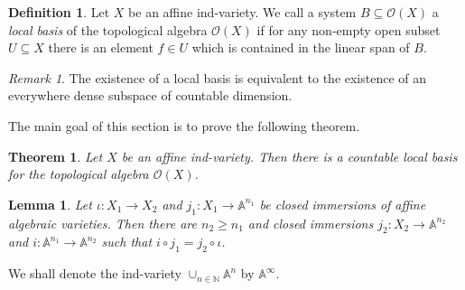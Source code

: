 \documentclass[a4paper,draft,reqno,12pt]{amsart}
\newtheorem{lemma}{Lemma}
\newtheorem{theorem}{Theorem}
\theoremstyle{definition}
\newtheorem{definition}{Definition}
\theoremstyle{remark}
\newtheorem {remark}{Remark}
\def\BN{{\mathbb N}}
\def\BA{{\mathbb A}}
\begin{document}
\begin{definition}\label{lb}
    Let $X$ be an affine ind-variety. We call a system $B \subseteq \mathcal{O}(X)$ a \emph{local basis} of the topological algebra $\mathcal{O}(X)$ if for any non-empty open subset $U \subseteq X$ there is an element $f \in U$ which is contained in the linear span of $B$.
\end{definition}

\begin{remark}
    The existence of a local basis is equivalent to the existence of an everywhere dense subspace of countable dimension.
\end{remark}

The main goal of this section is to prove the following theorem.

\begin{theorem}\label{countbasis}
    Let $X$ be an affine ind-variety. Then there is a countable local basis for the topological algebra $\mathcal{O}(X)$.
\end{theorem}

\begin{lemma}\cite[Lemma 1.5.2]{FK}\label{immersions}
    Let $\iota: X_1 \to X_2$ and $j_1: X_1 \to \BA^{n_1}$ be closed immersions of affine algebraic varieties. Then there are $n_2 \geq n_1$ and closed immersions $j_2: X_2 \to \BA^{n_2}$ and $i:\BA^{n_1} \to \BA^{n_2}$ such that $i \circ j_1 = j_2 \circ \iota$.
\end{lemma}

We shall denote the ind-variety $\cup_{n\in \BN} \BA^n$ by $\BA^{\infty}$. 
\end{document}

